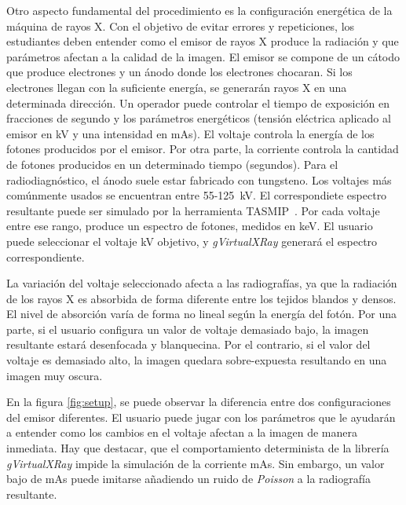Otro aspecto fundamental del procedimiento es la configuración energética de la máquina de rayos X. Con el objetivo de evitar errores y repeticiones, los estudiantes deben entender como el emisor de rayos X produce la radiación y que parámetros afectan a la calidad de la imagen. El emisor se compone de un cátodo que produce electrones y un ánodo donde los electrones chocaran. Si los electrones llegan con la suficiente energía, se generarán rayos X en una determinada dirección. Un operador puede controlar el tiempo de exposición en fracciones de segundo y los parámetros energéticos (tensión eléctrica aplicado al emisor en \ac{kV} y una intensidad en \ac{mAs}). El voltaje controla la energía de los fotones producidos por el emisor. Por otra parte, la corriente controla la cantidad de fotones producidos en un determinado tiempo (segundos). 
Para el radiodiagnóstico, el ánodo suele estar fabricado con tungsteno. Los voltajes más comúnmente usados se encuentran entre 55-125~\ac{kV}. El correspondiete espectro resultante puede ser simulado por la herramienta \ac{TASMIP}~\cite{Boone1997}. Por cada voltaje entre ese rango, produce un espectro de fotones, medidos en \ac{keV}. El usuario puede seleccionar el voltaje \ac{kV} objetivo, y \emph{gVirtualXRay} generará el espectro correspondiente.

La variación del voltaje seleccionado afecta a las radiografías, ya que la radiación de los rayos X es absorbida de forma diferente entre los tejidos blandos y densos. El nivel de absorción varía de forma no lineal según la energía del fotón. 
Por una parte, si el usuario configura un valor de voltaje demasiado bajo, la imagen resultante estará desenfocada y blanquecina. Por el contrario, si el valor del voltaje es demasiado alto, la imagen quedara sobre-expuesta resultando en una imagen muy oscura.

En la figura \ref{fig:setup}, se puede observar la diferencia entre dos configuraciones del emisor diferentes. El usuario puede jugar con los parámetros que le ayudarán a entender como los cambios en el voltaje afectan a la imagen de manera inmediata. Hay que destacar, que el comportamiento determinista de la librería \emph{gVirtualXRay} impide la simulación de la corriente \ac{mAs}. Sin embargo, un valor bajo de \ac{mAs} puede imitarse añadiendo un ruido de \emph{Poisson} a la radiografía resultante.



